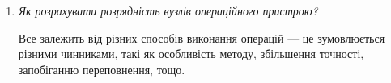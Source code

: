 \documentclass[12pt,a4paper]{article}
\begin{document}
\begin{enumerate}
        \vspace{1em}

        \item \textit{Як розрахувати розрядність вузлів операційного пристрою?}
        
        Все залежить від різних способів виконання операцій --- це зумовлюється різними чинниками, такі як особливість методу, збільшення точності, запобіганню переповнення, тощо.

    \end{enumerate}
\end{document}
